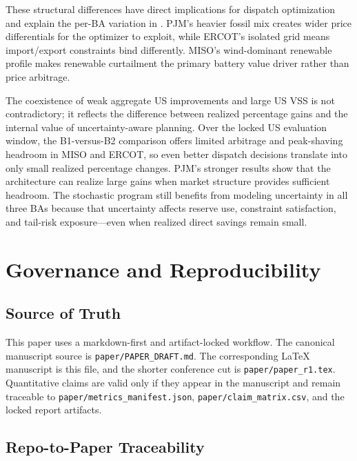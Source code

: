 \documentclass[11pt,a4paper]{article}
\begin{document}
These structural differences have direct implications for dispatch optimization and explain the per-BA variation in . PJM's heavier fossil mix creates wider price differentials for the optimizer to exploit, while ERCOT's isolated grid means import/export constraints bind differently. MISO's wind-dominant renewable profile makes renewable curtailment the primary battery value driver rather than price arbitrage.

The coexistence of weak aggregate US improvements and large US VSS is not contradictory; it reflects the difference between realized percentage gains and the internal value of uncertainty-aware planning. Over the locked US evaluation window, the B1-versus-B2 comparison offers limited arbitrage and peak-shaving headroom in MISO and ERCOT, so even better dispatch decisions translate into only small realized percentage changes. PJM's stronger results show that the architecture can realize large gains when market structure provides sufficient headroom. The stochastic program still benefits from modeling uncertainty in all three BAs because that uncertainty affects reserve use, constraint satisfaction, and tail-risk exposure---even when realized direct savings remain small.

\section{Governance and Reproducibility}\label{sec:governance}

\subsection{Source of Truth}

This paper uses a markdown-first and artifact-locked workflow. The canonical manuscript source is \texttt{paper/PAPER\_DRAFT.md}. The corresponding LaTeX manuscript is this file, and the shorter conference cut is \texttt{paper/paper\_r1.tex}. Quantitative claims are valid only if they appear in the manuscript and remain traceable to \texttt{paper/metrics\_manifest.json}, \texttt{paper/claim\_matrix.csv}, and the locked report artifacts.

\subsection{Repo-to-Paper Traceability}
\end{document}

